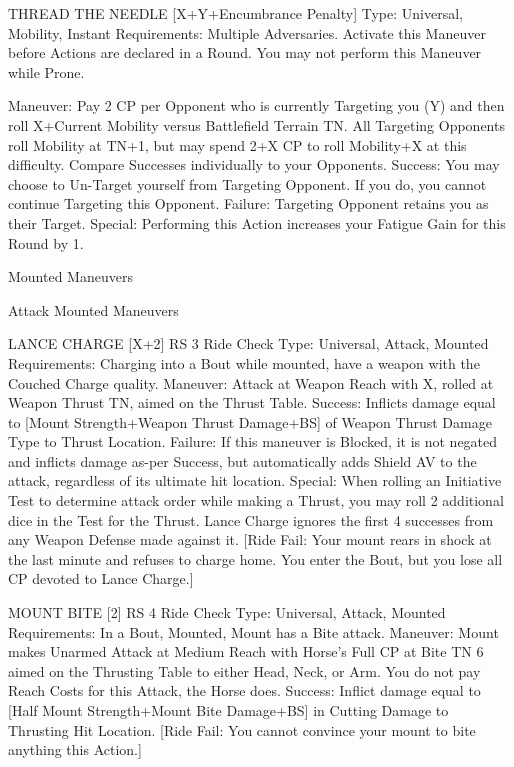 \documentclass[oneside,11pt,english]{book}
\begin{document}
 

THREAD THE NEEDLE [X+Y+Encumbrance Penalty] 
Type: Universal, Mobility, Instant 
Requirements: Multiple Adversaries. Activate this Maneuver before Actions are declared in a Round. 
You may not perform this Maneuver while Prone. 


Maneuver: Pay 2 CP per Opponent who is currently Targeting you (Y) and then roll X+Current Mobility 
versus Battlefield Terrain TN. All Targeting Opponents roll Mobility at TN+1, but may spend 2+X CP to 
roll Mobility+X at this difficulty. Compare Successes individually to your Opponents. 
Success: You may choose to Un-Target yourself from Targeting Opponent. If you do, you cannot 
continue Targeting this Opponent. 
Failure: Targeting Opponent retains you as their Target. 
Special: Performing this Action increases your Fatigue Gain for this Round by 1. 

 

 

Mounted Maneuvers 

 

Attack Mounted Maneuvers 

 

LANCE CHARGE [X+2] {RS 3 Ride Check} 
Type: Universal, Attack, Mounted 
Requirements: Charging into a Bout while mounted, have a weapon with the Couched Charge quality. 
Maneuver: Attack at Weapon Reach with X, rolled at Weapon Thrust TN, aimed on the Thrust Table. 
Success: Inflicts damage equal to [Mount Strength+Weapon Thrust Damage+BS] of Weapon Thrust 
Damage Type to Thrust Location. 
Failure: If this maneuver is Blocked, it is not negated and inflicts damage as-per Success, but 
automatically adds Shield AV to the attack, regardless of its ultimate hit location. 
Special: When rolling an Initiative Test to determine attack order while making a Thrust, you may roll 2 
additional dice in the Test for the Thrust. 
Lance Charge ignores the first 4 successes from any Weapon Defense made against it. 
[Ride Fail: Your mount rears in shock at the last minute and refuses to charge home. You enter the Bout, 
but you lose all CP devoted to Lance Charge.] 

 

MOUNT BITE [2] {RS 4 Ride Check} 
Type: Universal, Attack, Mounted 
Requirements: In a Bout, Mounted, Mount has a Bite attack. 
Maneuver: Mount makes Unarmed Attack at Medium Reach with Horse’s Full CP at Bite TN 6 aimed on 
the Thrusting Table to either Head, Neck, or Arm. You do not pay Reach Costs for this Attack, the Horse 
does. 
Success: Inflict damage equal to [Half Mount Strength+Mount Bite Damage+BS] in Cutting Damage to 
Thrusting Hit Location. 
[Ride Fail: You cannot convince your mount to bite anything this Action.] 
\end{document}
